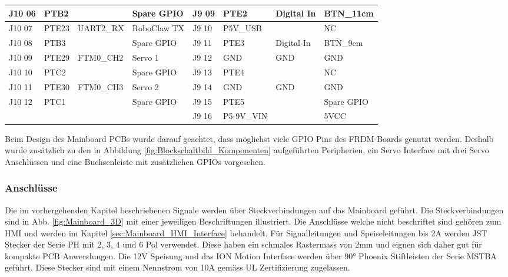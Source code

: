 \begin{table}[H]
\begin{tabular}{|r|r|r|r|l|l|r|l|}
		\hline
		\multicolumn{1}{|l|}{J10 06} & \multicolumn{1}{l|}{PTB2 } &       & \multicolumn{1}{l|}{Spare GPIO} & J9 09 & PTE2  & \multicolumn{1}{l|}{Digital In} & BTN\_11cm \\
		\hline
		\multicolumn{1}{|l|}{J10 07} & \multicolumn{1}{l|}{PTE23} & \multicolumn{1}{l|}{UART2\_RX} & \multicolumn{1}{l|}{RoboClaw TX} & J9 10 & P5V\_USB &       & NC \\
		\hline
		\multicolumn{1}{|l|}{J10 08} & \multicolumn{1}{l|}{PTB3 } &       & \multicolumn{1}{l|}{Spare GPIO} & J9 11 & PTE3  & \multicolumn{1}{l|}{Digital In} & BTN\_9cm \\
		\hline
		\multicolumn{1}{|l|}{J10 09} & \multicolumn{1}{l|}{PTE29} & \multicolumn{1}{l|}{FTM0\_CH2} & \multicolumn{1}{l|}{Servo 1} & J9 12 & GND   & \multicolumn{1}{l|}{GND} & GND \\
		\hline
		\multicolumn{1}{|l|}{J10 10} & \multicolumn{1}{l|}{PTC2} &       & \multicolumn{1}{l|}{Spare GPIO} & J9 13 & PTE4  &       & NC \\
		\hline
		\multicolumn{1}{|l|}{J10 11} & \multicolumn{1}{l|}{PTE30} & \multicolumn{1}{l|}{FTM0\_CH3} & \multicolumn{1}{l|}{Servo 2} & J9 14 & GND   & \multicolumn{1}{l|}{GND} & GND \\
		\hline
		\multicolumn{1}{|l|}{J10 12} & \multicolumn{1}{l|}{PTC1} &       & \multicolumn{1}{l|}{Spare GPIO} & J9 15 & PTE5  &       & Spare GPIO \\
		\hline
		&       &       &       & J9 16 & P5-9V\_VIN &       & 5VCC \\
		\hline
	\end{tabular}%
	\label{tab:FRDM_Port_Mapping}%
\end{table}%

Beim Design des Mainboard PCBs wurde darauf geachtet, dass möglichst viele GPIO Pins des FRDM-Boards genutzt werden. Deshalb wurde zusätzlich zu den in Abbildung \ref{fig:Blockschaltbild_Komponenten} aufgeführten Peripherien, ein Servo Interface mit drei Servo Anschlüssen und eine Buchsenleiste mit zusätzlichen GPIOs vorgesehen.

\subsubsection{Anschlüsse}
Die im vorhergehenden Kapitel beschriebenen Signale werden über Steckverbindungen auf das Mainboard geführt. Die Steckverbindungen sind in Abb. \ref{fig:Mainboard_3D} mit einer jeweiligen Beschriftungen illustriert. Die Anschlüsse welche nicht beschriftet sind gehören zum HMI und werden im Kapitel \ref{sec:Mainboard_HMI_Interface} behandelt. Für Signalleitungen und Speiseleitungen bis 2A werden JST Stecker der Serie PH mit 2, 3, 4 und 6 Pol verwendet. Diese haben ein schmales Rastermass von 2mm und eignen sich daher gut für kompakte PCB Anwendungen. Die 12V Speisung und das ION Motion Interface werden über 90° Phoenix Stiftleisten der Serie MSTBA geführt. Diese Stecker sind mit einem Nennstrom von 10A gemäss UL Zertifizierung zugelassen.

